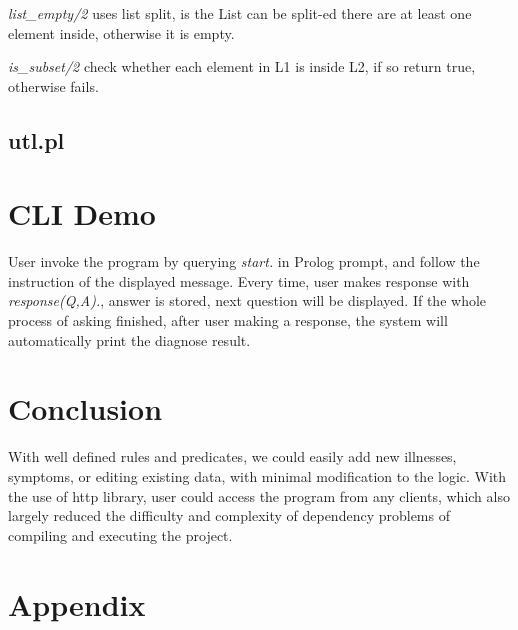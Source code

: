 \documentclass[11pt]{article}
\begin{document}
\emph{list\_empty/2} uses list split, is the List can be split-ed there are at least one element inside, otherwise it is empty.

\emph{is\_subset/2} check whether each element in L1 is inside L2, if so return true, otherwise fails.
\subsection*{utl.pl}


\section*{CLI Demo}
User invoke the program by querying \emph{start.} in Prolog prompt, and follow the instruction of the displayed message. Every time, user makes response with \emph{response(Q,A).}, answer is stored, next question will be displayed. If the whole process of asking finished, after user making a response, the system will automatically print the diagnose result.


\section*{Conclusion}
With well defined rules and predicates, we could easily add new illnesses, symptoms, or editing existing data, with minimal modification to the logic. With the use of http library, user could access the program from any clients, which also largely reduced the difficulty and complexity of dependency problems of compiling and executing the project.

\newpage
\section*{Appendix}
\end{document}
